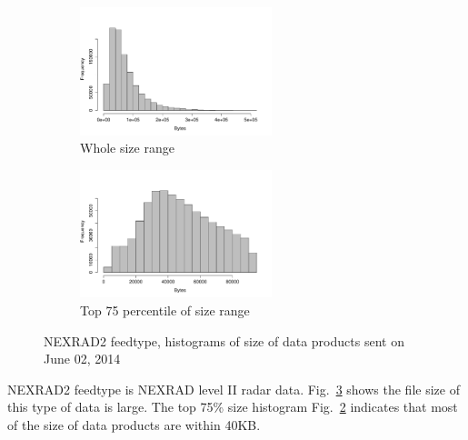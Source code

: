\begin{figure}[htb!]
\centering
    \begin{subfigure}{0.5\linewidth}
        \centering
        \includegraphics[width=2.2in]{figures/size-hist-NEXRAD20602.pdf}
        \caption{Whole size range }
        \label{NEXRAD2_Size_Whole}
    \end{subfigure}\hfill
    \begin{subfigure}{0.5\linewidth}
	\centering
    \includegraphics[width=2.2in]{figures/size-hist-NEXRAD20602-TOP75.pdf}
        \caption{Top 75 percentile of size range}
        \label{NEXRAD2_Size_75}
    \end{subfigure}\hfill
    \caption{NEXRAD2 feedtype, histograms of size of data products sent on June 02, 2014}
    \label{NEXRAD2_Size}
\end{figure}

NEXRAD2 feedtype is NEXRAD level II radar data. Fig.~\ref{NEXRAD2_Size} shows the file size of this type of data is large. The top 75\% size histogram Fig.~\ref{NEXRAD2_Size_75} indicates that most of the size of data products are within 40KB.

